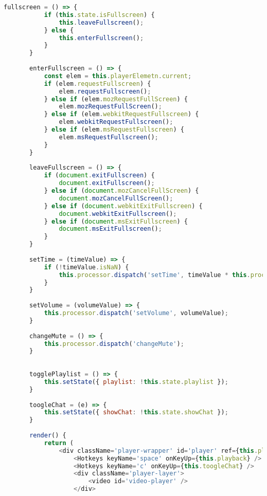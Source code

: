 \begin{lstlisting}[language=JavaScript,label={lst:player},caption={Компонент Player}]
       fullscreen = () => {
           if (this.state.isFullscreen) {
               this.leaveFullscreen();
           } else {
               this.enterFullscreen();
           }
       }
     
       enterFullscreen = () => {
           const elem = this.playerElemetn.current;
           if (elem.requestFullscreen) {
               elem.requestFullscreen();
           } else if (elem.mozRequestFullScreen) {
               elem.mozRequestFullScreen();
           } else if (elem.webkitRequestFullscreen) {
               elem.webkitRequestFullscreen();
           } else if (elem.msRequestFullscreen) {
               elem.msRequestFullscreen();
           }
       }
     
       leaveFullscreen = () => {
           if (document.exitFullscreen) {
               document.exitFullscreen();
           } else if (document.mozCancelFullScreen) {
               document.mozCancelFullScreen();
           } else if (document.webkitExitFullscreen) {
               document.webkitExitFullscreen();
           } else if (document.msExitFullscreen) {
               document.msExitFullscreen();
           }
       }
     
       setTime = (timeValue) => {
           if (!timeValue.isNaN) {
               this.processor.dispatch('setTime', timeValue * this.processor.duration);
           }
       }
     
       setVolume = (volumeValue) => {
           this.processor.dispatch('setVolume', volumeValue);
       }
     
       changeMute = () => {
           this.processor.dispatch('changeMute');
       }
     
     
       togglePlaylist = () => {
           this.setState({ playlist: !this.state.playlist });
       }
     
       toogleChat = (e) => {
           this.setState({ showChat: !this.state.showChat });
       }
     
       render() {
           return (
               <div className='player-wrapper' id='player' ref={this.playerElemetn}>
                   <Hotkeys keyName='space' onKeyUp={this.playback} />
                   <Hotkeys keyName='c' onKeyUp={this.toogleChat} />
                   <div className='player-layer'>
                       <video id='video-player' />
                   </div>
     

\end{lstlisting}
